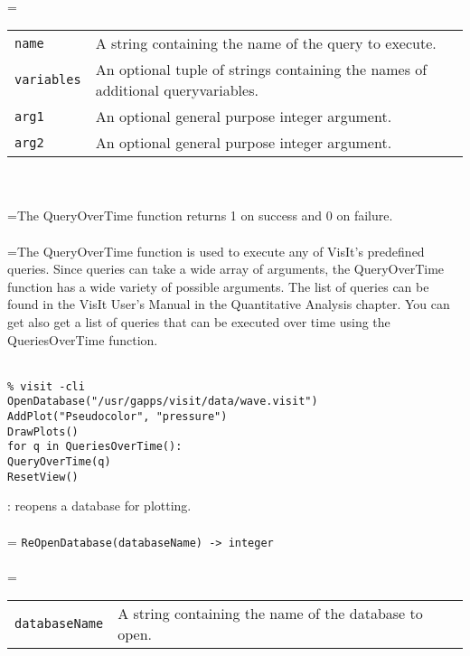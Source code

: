 \documentclass[10pt,a4paper]{report}
\begin{document}
 \\ 
\hangindent=\parindent 
\begin{tabular}{lp{9cm}}
\verb!name! & A string containing the name of the query to execute. \\
\verb!variables! & An optional tuple of strings containing the names of additional queryvariables. \\
\verb!arg1! & An optional general purpose integer argument. \\
\verb!arg2! & An optional general purpose integer argument. \\
\end{tabular} \\[-2mm]


 \\ 
\hangindent=\parindent The QueryOverTime function returns 1 on success and 0 on failure. \\[-3mm] 

 \\ 
\hangindent=\parindent The QueryOverTime function is used to execute any of VisIt's predefined queries. Since queries can take a wide array of arguments, the QueryOverTime function has a wide variety of possible arguments. The list of queries can be found in the VisIt User's Manual in the Quantitative Analysis chapter. You can get also get a list of queries that can be executed over time using the QueriesOverTime function. \\[-3mm] 

\\[-6mm]
\begin{verbatim}% visit -cli
OpenDatabase("/usr/gapps/visit/data/wave.visit")
AddPlot("Pseudocolor", "pressure")
DrawPlots()
for q in QueriesOverTime():
QueryOverTime(q)
ResetView()
\end{verbatim}
\newpage


{}
: reopens a database for plotting.\\[-3mm]

 \\ 
\hangindent=\parindent 
\verb!ReOpenDatabase(databaseName) -> integer!\\ [-3mm]

 \\ 
\hangindent=\parindent 
\begin{tabular}{lp{9cm}}
\verb!databaseName! & A string containing the name of the database to open. \\
\end{tabular} \\[-2mm]
\end{document}

